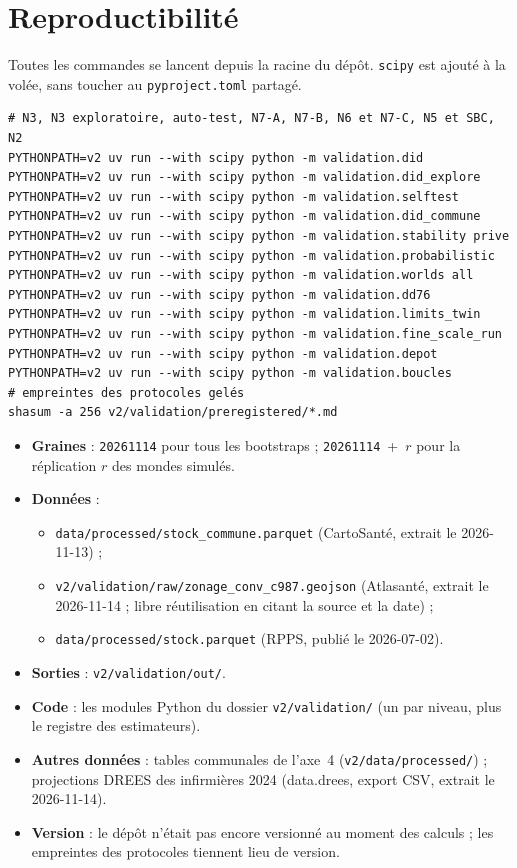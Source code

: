 \section{Reproductibilité}\label{a3-sec:repro}
Toutes les commandes se lancent depuis la racine du dépôt. \texttt{scipy} est ajouté à la volée,
sans toucher au \texttt{pyproject.toml} partagé.
\begin{verbatim}
# N3, N3 exploratoire, auto-test, N7-A, N7-B, N6 et N7-C, N5 et SBC, N2
PYTHONPATH=v2 uv run --with scipy python -m validation.did
PYTHONPATH=v2 uv run --with scipy python -m validation.did_explore
PYTHONPATH=v2 uv run --with scipy python -m validation.selftest
PYTHONPATH=v2 uv run --with scipy python -m validation.did_commune
PYTHONPATH=v2 uv run --with scipy python -m validation.stability prive
PYTHONPATH=v2 uv run --with scipy python -m validation.probabilistic
PYTHONPATH=v2 uv run --with scipy python -m validation.worlds all
PYTHONPATH=v2 uv run --with scipy python -m validation.dd76
PYTHONPATH=v2 uv run --with scipy python -m validation.limits_twin
PYTHONPATH=v2 uv run --with scipy python -m validation.fine_scale_run
PYTHONPATH=v2 uv run --with scipy python -m validation.depot
PYTHONPATH=v2 uv run --with scipy python -m validation.boucles
# empreintes des protocoles gelés
shasum -a 256 v2/validation/preregistered/*.md
\end{verbatim}
\begin{itemize}
  \item \textbf{Graines} : \texttt{20261114} pour tous les bootstraps ; \texttt{20261114}~+~$r$ pour
        la réplication $r$ des mondes simulés.
  \item \textbf{Données} :
        \begin{itemize}
          \item \texttt{data/processed/stock\_commune.parquet} (CartoSanté, extrait le 2026-11-13) ;
          \item \texttt{v2/validation/raw/zonage\_conv\_c987.geojson} (Atlasanté, extrait le
                2026-11-14 ; libre réutilisation en citant la source et la date) ;
          \item \texttt{data/processed/stock.parquet} (RPPS, publié le 2026-07-02).
        \end{itemize}
  \item \textbf{Sorties} : \texttt{v2/validation/out/}.
  \item \textbf{Code} : les modules Python du dossier \texttt{v2/validation/} (un par niveau,
        plus le registre des estimateurs).
  \item \textbf{Autres données} : tables communales de l'axe~4
        (\texttt{v2/data/processed/}) ; projections DREES des infirmières 2024 (data.drees, export
        CSV, extrait le 2026-11-14).
  \item \textbf{Version} : le dépôt n'était pas encore versionné au moment des calculs ; les
        empreintes des protocoles tiennent lieu de version.
\end{itemize}

